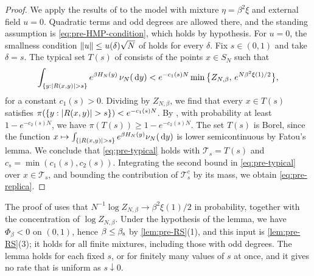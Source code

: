 \begin{proof}
We apply the results of \cite[Section~7.1]{HuangMontanariPham2024} to the model \cite[(7.7)--(7.8)]{HuangMontanariPham2024} with mixture $\eta=\beta^2\xi$ and external field $u=0$. Quadratic terms and odd degrees are allowed there, and the standing assumption \cite[(7.9)]{HuangMontanariPham2024} is \eqref{eq:pre-HMP-condition}, which holds by hypothesis. For $u=0$, the smallness condition $\left\lVert u\right\rVert\le u(\delta)\sqrt N$ of \cite[Lemma~7.7]{HuangMontanariPham2024} holds for every $\delta$. Fix $s\in(0,1)$ and take $\delta=s$. The typical set $T(s)$ of \cite[(7.31)]{HuangMontanariPham2024} consists of the points $x\in S_N$ such that
\[
\int_{\{y:\abs{R(x,y)}>s\}}e^{\beta H_N(y)}\,\nu_N(\dd y)<e^{-c_1(s)N}\min\big\{Z_{N,\beta},\,e^{N\beta^2\xi(1)/2}\big\},
\]
for a constant $c_1(s)>0$. Dividing by $Z_{N,\beta}$, we find that every $x\in T(s)$ satisfies $\pi(\{y:\abs{R(x,y)}>s\})<e^{-c_1(s)N}$. By \cite[(7.34)]{HuangMontanariPham2024}, with probability at least $1-e^{-c_2(s)N}$, we have $\pi(T(s))\ge1-e^{-c_2(s)N}$. The set $T(s)$ is Borel, since the function $x\mapsto\int_{\{\abs{R(x,y)}>s\}}e^{\beta H_N(y)}\nu_N(\dd y)$ is lower semicontinuous by Fatou's lemma. We conclude that \eqref{eq:pre-typical} holds with $\mathcal T_s=T(s)$ and $c_s=\min(c_1(s),c_2(s))$. Integrating the second bound in \eqref{eq:pre-typical} over $x\in\mathcal T_s$, and bounding the contribution of $\mathcal T_s^c$ by its mass, we obtain \eqref{eq:pre-replica}.
\end{proof}

The proof of \cite[Lemma~7.7]{HuangMontanariPham2024} uses that $N^{-1}\log Z_{N,\beta}\to\beta^2\xi(1)/2$ in probability, together with the concentration of $\log Z_{N,\beta}$. Under the hypothesis of the lemma, we have $\Phi_\beta<0$ on $(0,1)$, hence $\beta\le\beta_{\mathrm s}$ by \cref{lem:pre-RS}(1), and this input is \cref{lem:pre-RS}(3); it holds for all finite mixtures, including those with odd degrees. The lemma holds for each fixed $s$, or for finitely many values of $s$ at once, and it gives no rate that is uniform as $s\downarrow0$.
